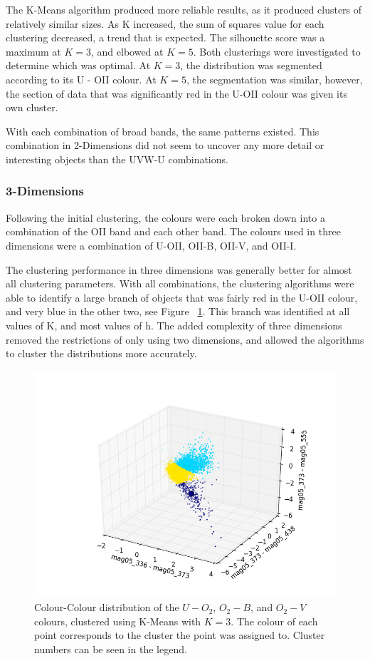 The K-Means algorithm produced more reliable results, as it produced clusters of relatively similar sizes.
As K increased, the sum of squares value for each clustering decreased, a trend that is expected.
The silhouette score was a maximum at $K=3$, and elbowed at $K=5$. Both clusterings were investigated to determine which was optimal.
At $K=3$, the distribution was segmented according to its U - OII colour.
At $K=5$, the segmentation was similar, however, the section of data that was significantly red in the U-OII colour was given its own cluster.

With each combination of broad bands, the same patterns existed.
This combination in 2-Dimensions did not seem to uncover any more detail or interesting objects than the UVW-U combinations.

\subsubsection{3-Dimensions}

Following the initial clustering, the colours were each broken down into a combination of the OII band and each other band.
The colours used in three dimensions were a combination of U-OII, OII-B, OII-V, and OII-I.

The clustering performance in three dimensions was generally better for almost all clustering parameters.
With all combinations, the clustering algorithms were able to identify a large branch of objects that was fairly red in the U-OII colour, and very blue in the other two, see Figure ~\ref{fig:UOIIKM3d}.
This branch was identified at all values of K, and most values of h.
The added complexity of three dimensions removed the restrictions of only using two dimensions, and allowed the algorithms to cluster the distributions more accurately.

\begin{figure}
\centering
\includegraphics[width=\linewidth]{figs/kmeans_3d_color_3cl_mag05_336-mag05_373vsmag05_373-mag05_438vsmag05_373-mag05_555}
\caption{Colour-Colour distribution of the $U-O_{2}$, $O_{2}-B$, and $O_{2}-V$ colours, clustered using K-Means with $K=3$. The colour of each point corresponds to the cluster the point was assigned to. Cluster numbers can be seen in the legend.}
\label{fig:UOIIKM3d}
\end{figure}

